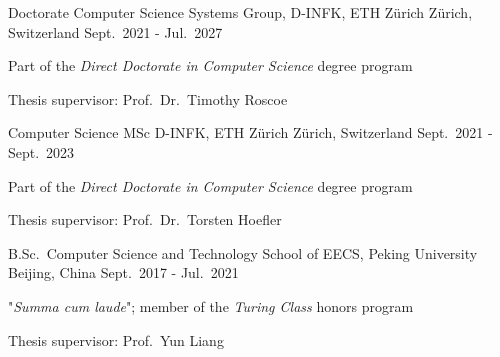 

\begin{cventries}

  \cventry
    {Doctorate Computer Science} %
    {Systems Group, D-INFK, ETH Zürich} %
    {Zürich, Switzerland} %
    {Sept.\ 2021 - Jul.\ 2027} %
    {
      \begin{cvitems} %
      \item {Part of the \emph{Direct Doctorate in Computer Science} degree program}
      \item {Thesis supervisor: Prof.\ Dr.\ Timothy Roscoe}
      \end{cvitems}
    }

  \cventry
    {Computer Science MSc} %
    {D-INFK, ETH Zürich} %
    {Zürich, Switzerland} %
    {Sept.\ 2021 - Sept.\ 2023} %
    {
      \begin{cvitems} %
      \item {Part of the \emph{Direct Doctorate in Computer Science} degree program}
      \item {Thesis supervisor: Prof.\ Dr.\ Torsten Hoefler}
      \end{cvitems}
    }

  \cventry
    {B.Sc.\ Computer Science and Technology} %
    {School of EECS, Peking University} %
    {Beijing, China} %
    {Sept.\ 2017 - Jul.\ 2021} %
    {
      \begin{cvitems} %
      \item {"\emph{Summa cum laude}"; member of the \emph{Turing Class} honors program}
      \item {Thesis supervisor: Prof.\ Yun Liang}
      \end{cvitems}
    }

\end{cventries}
